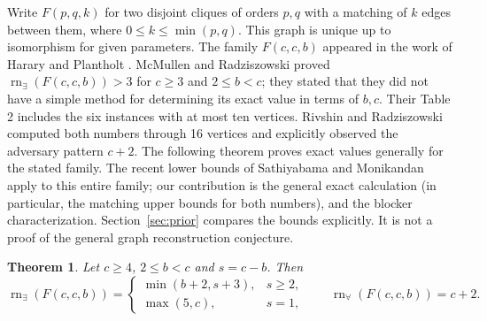 \documentclass[11pt]{article}
\newtheorem{theorem}{Theorem}
\newcommand{\rn}{\operatorname{rn}}
\begin{document}
Write $F(p,q,k)$ for two disjoint cliques of orders $p,q$ with a matching of $k$ edges between them, where $0\leq k\leq\min(p,q)$. This graph is unique up to isomorphism for given parameters. The family $F(c,c,b)$ appeared in the work of Harary and Plantholt \cite{HP}. McMullen and Radziszowski \cite[Theorem 5, Table 2 and Section 2.2.4]{MR} proved $\rn_\exists(F(c,c,b))>3$ for $c\geq3$ and $2\leq b<c$; they stated that they did not have a simple method for determining its exact value in terms of $b,c$. Their Table 2 includes the six instances with at most ten vertices. Rivshin and Radziszowski \cite[Section 2, Table 5]{RR} computed both numbers through 16 vertices and explicitly observed the adversary pattern $c+2$. The following theorem proves exact values generally for the stated family. The recent lower bounds of Sathiyabama and Monikandan \cite[Theorem 9]{SM} apply to this entire family; our contribution is the general exact calculation (in particular, the matching upper bounds for both numbers), and the blocker characterization. Section~\ref{sec:prior} compares the bounds explicitly. It is not a proof of the general graph reconstruction conjecture.
\begin{theorem}\label{thm:main}
Let $c\geq4$, $2\leq b<c$ and $s=c-b$. Then
\[
\rn_\exists(F(c,c,b))=\begin{cases}
\min(b+2,s+3),&s\geq2,\\
\max(5,c),&s=1,
\end{cases}
\qquad \rn_\forall(F(c,c,b))=c+2.
\]
\end{theorem}
\end{document}
